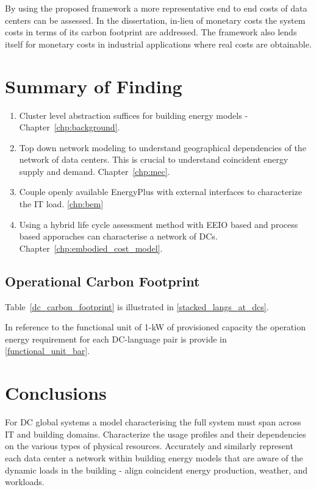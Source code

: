 By using the proposed framework a more representative end to end costs of data centers can be assessed. In the dissertation, in-lieu of monetary costs the system costs in terms of its carbon footprint are addressed. The framework also lends itself for monetary costs in industrial applications where real costs are obtainable.

\section{Summary of Finding}
\begin{enumerate}
    \item Cluster level abstraction suffices for building energy models - Chapter~\ref{chp:background}.
    \item Top down network modeling to understand geographical dependencies of the network of data centers. This is crucial to understand coincident energy supply and demand. Chapter~\ref{chp:mec}.
    \item Couple openly available EnergyPlus with external interfaces to characterize the IT load. \ref{chp:bem}
    \item Using a hybrid life cycle assessment method with EEIO based and process based apporaches can characterise a network of DCs. Chapter~\ref{chp:embodied_cost_model}.
\end{enumerate}


\subsection{Operational Carbon Footprint}
Table~\ref{dc_carbon_footprint} is illustrated in \ref{stacked_langs_at_dcs}.


In reference to the functional unit of 1-kW of provisioned capacity the operation energy requirement for each DC-language pair is provide in \ref{functional_unit_bar}.



\section{Conclusions}
For DC global systems a model characterising the full system must span across IT and building domains. Characterize the usage profiles and their dependencies on the various types of physical resources. Accurately and similarly represent each data center a network within building energy models that are aware of the dynamic loads in the building - align coincident energy production, weather, and workloads.

